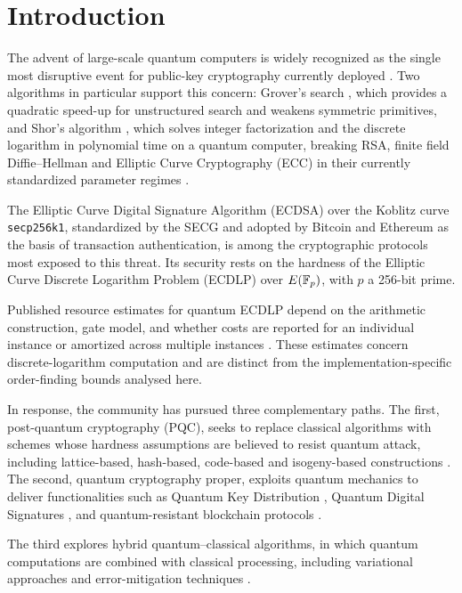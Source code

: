 \section{Introduction}
\label{sec:introduction}

The advent of large-scale quantum computers is widely recognized as the single most disruptive event for public-key cryptography currently deployed \cite{Mosca2018, NIST_PQC_2022, Joseph2022}. Two algorithms in particular support this concern: Grover's search \cite{Grover1996}, which provides a quadratic speed-up for unstructured search and weakens symmetric primitives, and Shor's algorithm \cite{Shor1994, Shor1997}, which solves integer factorization and the discrete logarithm in polynomial time on a quantum computer, breaking RSA, finite field Diffie--Hellman and Elliptic Curve Cryptography (ECC) in their currently standardized parameter regimes \cite{Hankerson2004, Bernstein2017}. 

The Elliptic Curve Digital Signature Algorithm (ECDSA) over the Koblitz curve \texttt{secp256k1}, standardized by the SECG \cite{SEC2_2010} and adopted by Bitcoin \cite{Nakamoto2008} and Ethereum \cite{Buterin2014} as the basis of transaction authentication, is among the cryptographic protocols most exposed to this threat. Its security rests on the hardness of the Elliptic Curve Discrete Logarithm Problem (ECDLP) over $E(\mathbb{F}_p)$, with $p$ a 256-bit prime. \begin{revision}Published resource estimates for quantum ECDLP depend on the arithmetic construction, gate model, and whether costs are reported for an individual instance or amortized across multiple instances \cite{Roetteler2017,Haner2020,Litinski2023}. These estimates concern discrete-logarithm computation and are distinct from the implementation-specific order-finding bounds analysed here. \end{revision}

In response, the community has pursued three complementary paths. The first, post-quantum cryptography (PQC), seeks to replace classical algorithms with schemes whose hardness assumptions are believed to resist quantum attack, including lattice-based, hash-based, code-based and isogeny-based constructions \cite{NIST_PQC_2022, Bernstein2017, Ducas2018, Hulsing2020, Avanzi2019, Ding2020}. The second, quantum cryptography proper, exploits quantum mechanics to deliver functionalities such as Quantum Key Distribution \cite{Pirandola2020, BB84_1984}, Quantum Digital Signatures \cite{Gottesman2001, Amiri2016, Wallden2015}, and quantum-resistant blockchain protocols \cite{Kappert2021, FernandezCarames2020, Aggarwal2018}. \begin{revision}The third explores hybrid quantum--classical algorithms, in which quantum computations are combined with classical processing, including variational approaches and error-mitigation techniques \cite{Cerezo2021,Endo2021}.\end{revision}

